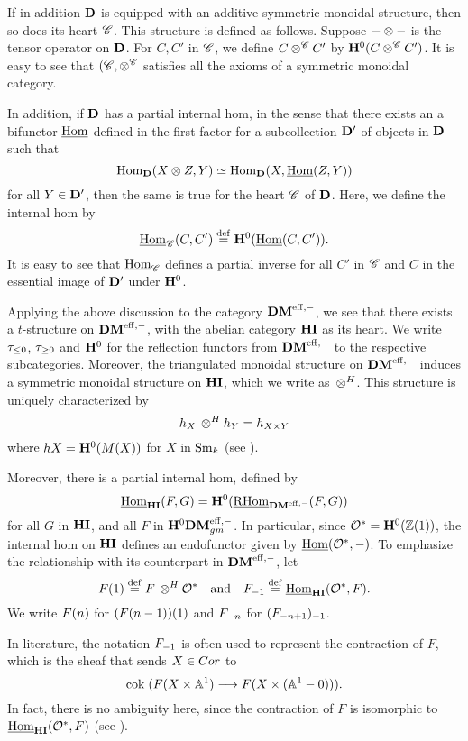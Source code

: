 If in addition $\DCat$ is equipped with an additive symmetric 
monoidal structure, then so does its heart $\Cat{C}$. This 
structure is defined as follows. Suppose $- \tensor -$ is the 
tensor operator on $\DCat$. For $C, C'$ in $\Cat{C}$, we define 
$C \tensor^{\Cat{C}} C'$ by $\HH^0(C \tensor^{\Cat{C}} C')$. It is 
easy to see that $(\Cat{C}, \tensor^{\Cat{C}}$ satisfies all the 
axioms of a symmetric monoidal category. 

In addition, if $\DCat$ has a partial internal hom, in the sense
that there exists an a bifunctor $\ihom$ defined in the first 
factor for a subcollection $\DCat'$ of objects in $\DCat$ such
that
\[
\hom_{\DCat}(X \tensor Z, Y) \simeq 
   \hom_{\DCat}(X, \ihom(Z, Y))
\]
for all $Y \in \DCat'$, then the same is true for the heart 
$\Cat{C}$ of $\DCat$. Here, we define the internal hom by
\[
\ihom_{\Cat{C}}(C, C') \defeq \HH^0(\ihom(C, C')).
\]
It is easy to see that $\ihom_{\Cat{C}}$ defines a partial inverse
for all $C'$ in $\Cat{C}$ and $C$ in the essential image of 
$\DCat'$ under $\HH^0$.

Applying the above discussion to the category $\DMeff$, we see 
that there exists a $t$-structure on $\DMeff$, with the abelian 
category $\HI$ as its heart. We write $\gltrunc{0}$, $\ggtrunc{0}$
and $\HH^0$ for the reflection functors from $\DMeff$ to the 
respective subcategories. Moreover, the triangulated monoidal 
structure on $\DMeff$ induces a symmetric monoidal structure on 
$\HI$, which we write as $\tHI$. This structure is uniquely 
characterized by
\[
\hS{X} \tHI \hS{Y} = \hS{X \times Y}
\]
where $h{X} = \HH^0(M(X))$ for $X$ in $\Sm$ (see 
\cite{DegModHom}).

Moreover, there is a partial internal hom, defined by
\[
\ihomHI(F, G) = \HH^0(\ihomDMf(F, G))
\]
for all $G$ in $\HI$, and all $F$ in $\HH^0\DMeffgm$. In 
particular, since $\Ox = \HH^0(\Z(1))$, the internal hom on $\HI$ 
defines an endofunctor given by $\ihom(\Ox, -)$. To emphasize the
relationship with its counterpart in $\DMeff$, let
\[
\LHI{F} \defeq F \tHI \Ox \hspace{10pt} \textrm{and}\hspace{10pt} 
   \RHI{F} \defeq \ihomHI(\Ox, F).
\]
We write $\LHI[n]{F}$ for $\LHI{(\LHI[n - 1]{F})}$ and 
$\RHI[n]{F}$ for $\RHI{(\RHI[n + 1]{F})}$.

\begin{rmk}\label{rmk_contract_rhi_eq}
In literature, the notation $\RHI{F}$ is often used to represent
the contraction of $F$, which is the sheaf that sends $X \in 
\Cor$ to 
\[
\cok( F(X \times \A^1) \to F(X \times (\A^1 - 0))).
\]
In fact, there is no ambiguity here, since the contraction of
$F$ is isomorphic to $\ihomHI(\Ox, F)$ (see \cite[]{DegModHom}).
\end{rmk}

